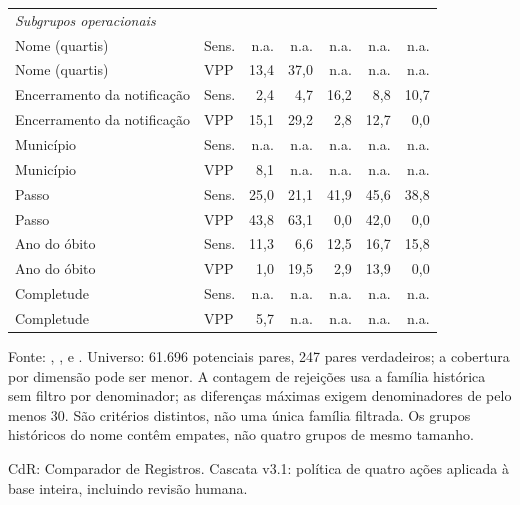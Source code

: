 \begin{table}[htbp]
{\begin{tabular}{llrrrrr}
\midrule
\multicolumn{7}{l}{\textit{Subgrupos operacionais}} \\
Nome (quartis) & Sens. & n.a. & n.a. & n.a. & n.a. & n.a. \\
Nome (quartis) & VPP & 13{,}4 & 37{,}0 & n.a. & n.a. & n.a. \\
Encerramento da notifica\c{c}\~ao & Sens. & 2{,}4 & 4{,}7 & 16{,}2 & 8{,}8 & 10{,}7 \\
Encerramento da notifica\c{c}\~ao & VPP & 15{,}1 & 29{,}2 & 2{,}8 & 12{,}7 & 0{,}0 \\
Munic\'ipio & Sens. & n.a. & n.a. & n.a. & n.a. & n.a. \\
Munic\'ipio & VPP & 8{,}1 & n.a. & n.a. & n.a. & n.a. \\
Passo & Sens. & 25{,}0 & 21{,}1 & 41{,}9 & 45{,}6 & 38{,}8 \\
Passo & VPP & 43{,}8 & 63{,}1 & 0{,}0 & 42{,}0 & 0{,}0 \\
Ano do \'obito & Sens. & 11{,}3 & 6{,}6 & 12{,}5 & 16{,}7 & 15{,}8 \\
Ano do \'obito & VPP & 1{,}0 & 19{,}5 & 2{,}9 & 13{,}9 & 0{,}0 \\
Completude & Sens. & n.a. & n.a. & n.a. & n.a. & n.a. \\
Completude & VPP & 5{,}7 & n.a. & n.a. & n.a. & n.a. \\
\bottomrule
\end{tabular}}
\par\footnotesize Fonte: , ,  e . Universo: 61.696 potenciais pares, 247 pares verdadeiros; a cobertura por dimensão pode ser menor. A contagem de rejeições usa a família histórica sem filtro por denominador; as diferenças máximas exigem denominadores de pelo menos 30. São critérios distintos, não uma única família filtrada. Os grupos históricos do nome contêm empates, não quatro grupos de mesmo tamanho.
\par\footnotesize CdR: Comparador de Registros. Cascata v3.1: política de quatro ações aplicada à base inteira, incluindo revisão humana.
\end{table}

